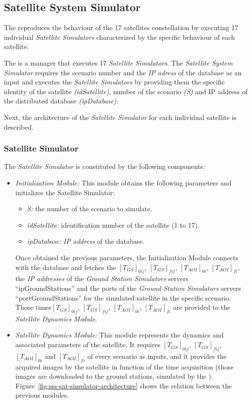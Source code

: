 \subsection{Satellite System Simulator}

The \satss reproduces the behaviour of the 17 satellites constellation by executing 17 individual \emph{Satellite Simulators} characterized by the specific behaviour of each satellite.

The \satss is a manager that executes 17 \emph{Satellite Simulators}. The
\emph{Satellite System Simulator} requires the scenario number and the \emph{IP
  adress} of the database as an input and executes the \emph{Satellite
  Simulators} by providing them the specific identity of the satellite
\emph{(idSatellite)}, number of the scenario \emph{(S)} and IP address of the distributed database  \emph{(ipDatabase)}.

Next, the architecture of the \emph{Satellite Simulator} for each individual
satellite is described.


\subsubsection{Satellite Simulator}

The \emph{Satellite Simulator} is constituted by the following components:
\begin{itemize}
\item \emph{Initialization Module:} This module obtains the following parameters
  and initializes the Satellite Simulator:
\begin{itemize}
\item \emph{S:} the number of the scenario to simulate.
\item \emph{idSatellite:} identification number of the satellite (1 to 17).
\item \emph{ipDatabase:} \emph{IP address} of the database.
\end{itemize}
Once obtained the previous parameters, the Initialization Module connects with the database and fetches the $[T_{GS}]_{0ij}$, $[T_{GS}]_{fij}$,  $[T_{AOI}]_{0i}$, $[T_{AOI}]_{fi}$, the \emph{IP addresses} of the \emph{Ground Station Simulators} servers “ipGroundStations” and  the ports of the \emph{Ground Station Simulators} servers “portGroundStations” for the simulated satellite in the specific scenario. Those times$[T_{GS}]_{0ij}$, $[T_{GS}]_{fij}$, $[T_{AOI}]_{0i}$, $[T_{AOI}]_{fi}$ are provided to the \emph{Satellite Dynamics Module}.

\item \emph{Satellite Dynamics Module:} This module represents the dynamics and
  associated parameters of the satellite. It requires $[T_{GS}]_{0ij}$, $[T_{GS}]_{fij}$,  $[T_{AOI}]_{0i}$ and $[T_{AOI}]_{fi}$ of every scenario as inputs, and it provides the acquired images by the satellite in function of the time acquisition (those images are downloaded to the ground stations, simulated by the \gsss).
Figure~\ref{fig:sss-sat-simulator-architecture} shows the relation between the previous modules.
\end{itemize}

